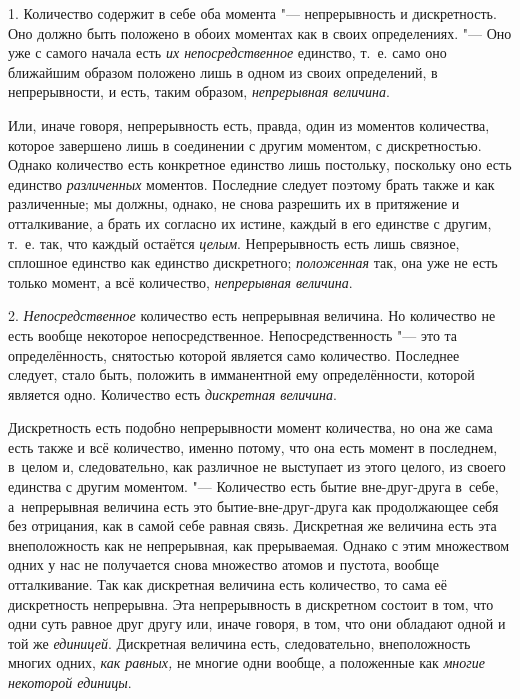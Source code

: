 
1. Количество содержит в себе оба момента "--- непрерывность и дискретность.
Оно должно быть положено в обоих моментах как в своих определениях. "--- Оно
уже с самого начала есть {\em их непосредственное} единство, т.~е. само оно
ближайшим образом положено лишь в одном из своих определений, в непрерывности,
и есть, таким образом, {\em непрерывная величина}.

Или, иначе говоря, непрерывность есть, правда, один из моментов количества,
которое завершено лишь в соединении с другим моментом, с дискретностью. Однако
количество есть конкретное единство лишь постольку, поскольку оно есть единство
{\em различенных} моментов. Последние следует поэтому брать также и как
различенные; мы должны, однако, не снова разрешить их в притяжение и
отталкивание, а брать их согласно их истине, каждый в его единстве с другим,
т.~е. так, что каждый остаётся {\em целым}. Непрерывность есть лишь связное,
сплошное единство как единство дискретного; {\em положенная} так, она уже не
есть только момент, а всё количество, {\em непрерывная величина}.

2. {\em Непосредственное} количество есть непрерывная величина. Но количество
не есть вообще некоторое непосредственное. Непосредственность "--- это та
определённость, снятостью которой является само количество. Последнее следует,
стало быть, положить в имманентной ему определённости, которой является одно.
Количество есть {\em дискретная величина}.

Дискретность есть подобно непрерывности момент количества, но она же сама есть
также и всё количество, именно потому, что она есть момент в последнем, в~целом
и, следовательно, как различное не выступает из этого целого, из своего
единства с другим моментом. "--- Количество есть бытие вне-друг-друга в~себе,
а~непрерывная величина есть это бытие-вне-друг-друга как продолжающее себя без
отрицания, как в самой себе равная связь. Дискретная же величина есть эта
внеположность как не непрерывная, как прерываемая. Однако с этим множеством
одних у нас не получается снова множество атомов и пустота, вообще
отталкивание. Так как дискретная величина есть количество, то сама её
дискретность непрерывна. Эта непрерывность в дискретном состоит в том, что одни
суть равное друг другу или, иначе говоря, в том, что они обладают одной и той
же {\em единицей}. Дискретная величина есть, следовательно, внеположность
многих одних, {\em как равных,} не многие одни вообще, а положенные как
{\em многие некоторой единицы}.

